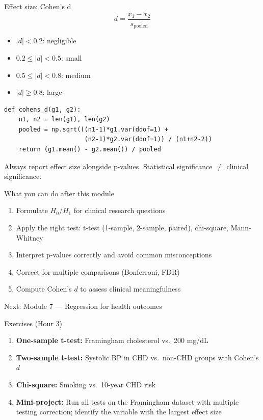 \documentclass[aspectratio=169,11pt]{beamer}
\begin{document}
\begin{frame}[fragile]{Effect size: Cohen's d}
$$d = \frac{\bar{x}_1 - \bar{x}_2}{s_{\text{pooled}}}$$

\begin{itemize}
  \item $|d| < 0.2$: negligible
  \item $0.2 \leq |d| < 0.5$: small
  \item $0.5 \leq |d| < 0.8$: medium
  \item $|d| \geq 0.8$: large
\end{itemize}

\begin{verbatim}
def cohens_d(g1, g2):
    n1, n2 = len(g1), len(g2)
    pooled = np.sqrt(((n1-1)*g1.var(ddof=1) +
                      (n2-1)*g2.var(ddof=1)) / (n1+n2-2))
    return (g1.mean() - g2.mean()) / pooled
\end{verbatim}

\alert{Always report effect size alongside p-values.} Statistical significance $\neq$ clinical significance.
\end{frame}

\begin{frame}{What you can do after this module}
\begin{enumerate}
  \item Formulate $H_0$/$H_1$ for clinical research questions
  \item Apply the right test: t-test (1-sample, 2-sample, paired), chi-square, Mann-Whitney
  \item Interpret p-values correctly and avoid common misconceptions
  \item Correct for multiple comparisons (Bonferroni, FDR)
  \item Compute Cohen's $d$ to assess clinical meaningfulness
\end{enumerate}

\vspace{12pt}
\centering
\Large \alert{Next: Module 7 --- Regression for health outcomes}
\end{frame}

\begin{frame}{Exercises (Hour 3)}
\begin{enumerate}
  \item \textbf{One-sample t-test:} Framingham cholesterol vs.\ 200 mg/dL
  \item \textbf{Two-sample t-test:} Systolic BP in CHD vs.\ non-CHD groups with Cohen's $d$
  \item \textbf{Chi-square:} Smoking vs.\ 10-year CHD risk
  \item \textbf{Mini-project:} Run all tests on the Framingham dataset with multiple testing correction; identify the variable with the largest effect size
\end{enumerate}
\end{frame}
\end{document}

